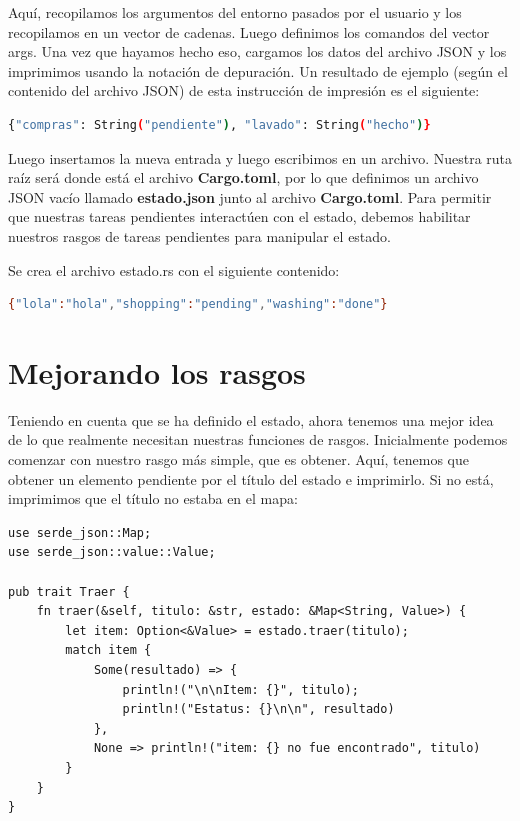 Aquí, recopilamos los argumentos del entorno pasados por el usuario y los recopilamos en un vector de cadenas. Luego definimos los comandos del vector args. Una vez que hayamos hecho eso, cargamos los datos del archivo JSON y los imprimimos usando la notación de depuración. Un resultado de ejemplo (según el contenido del archivo JSON) de esta instrucción de impresión es el siguiente:

\begin{lstlisting}[language=bash]
{"compras": String("pendiente"), "lavado": String("hecho")}
\end{lstlisting}

Luego insertamos la nueva entrada y luego escribimos en un archivo. Nuestra ruta raíz será donde está el archivo \textbf{Cargo.toml}, por lo que definimos un archivo JSON vacío llamado \textbf{estado.json} junto al archivo \textbf{Cargo.toml}. Para permitir que nuestras tareas pendientes interactúen con el estado, debemos habilitar nuestros rasgos de tareas pendientes para manipular el estado.

Se crea el archivo estado.rs con el siguiente contenido:

\begin{lstlisting}[language=bash]
{"lola":"hola","shopping":"pending","washing":"done"}
\end{lstlisting}


\section{Mejorando los rasgos}

Teniendo en cuenta que se ha definido el estado, ahora tenemos una mejor idea de lo que realmente necesitan nuestras funciones de rasgos. Inicialmente podemos comenzar con nuestro rasgo más simple, que es obtener. Aquí, tenemos que obtener un elemento pendiente por el título del estado e imprimirlo. Si no está, imprimimos que el título no estaba en el mapa:

\begin{lstlisting}
use serde_json::Map;
use serde_json::value::Value;

pub trait Traer {
	fn traer(&self, titulo: &str, estado: &Map<String, Value>) {
		let item: Option<&Value> = estado.traer(titulo);
		match item {
			Some(resultado) => {
				println!("\n\nItem: {}", titulo);
				println!("Estatus: {}\n\n", resultado)
			},
			None => println!("item: {} no fue encontrado", titulo)
		}
	}
}		
\end{lstlisting}

